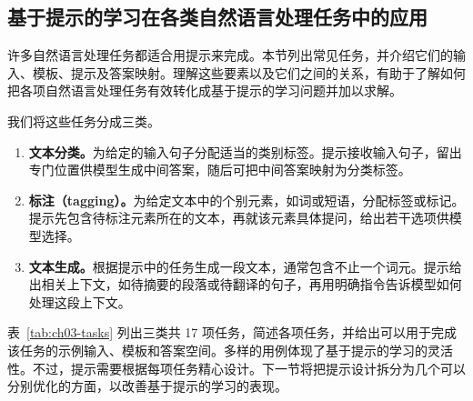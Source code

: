 \subsection{基于提示的学习在各类自然语言处理任务中的应用}
许多自然语言处理任务都适合用提示来完成。本节列出常见任务，并介绍它们的输入、模板、提示及答案映射。理解这些要素以及它们之间的关系，有助于了解如何把各项自然语言处理任务有效转化成基于提示的学习问题并加以求解。

我们将这些任务分成三类。
\begin{enumerate}
\item \textbf{文本分类。}为给定的输入句子分配适当的类别标签。提示接收输入句子，留出专门位置供模型生成中间答案，随后可把中间答案映射为分类标签。
\item \textbf{标注（tagging）。}为给定文本中的个别元素，如词或短语，分配标签或标记。提示先包含待标注元素所在的文本，再就该元素具体提问，给出若干选项供模型选择。
\item \textbf{文本生成。}根据提示中的任务生成一段文本，通常包含不止一个词元。提示给出相关上下文，如待摘要的段落或待翻译的句子，再用明确指令告诉模型如何处理这段上下文。
\end{enumerate}

表~\ref{tab:ch03-tasks} 列出三类共 17 项任务，简述各项任务，并给出可以用于完成该任务的示例输入、模板和答案空间。多样的用例体现了基于提示的学习的灵活性。不过，提示需要根据每项任务精心设计。下一节将把提示设计拆分为几个可以分别优化的方面，以改善基于提示的学习的表现。


